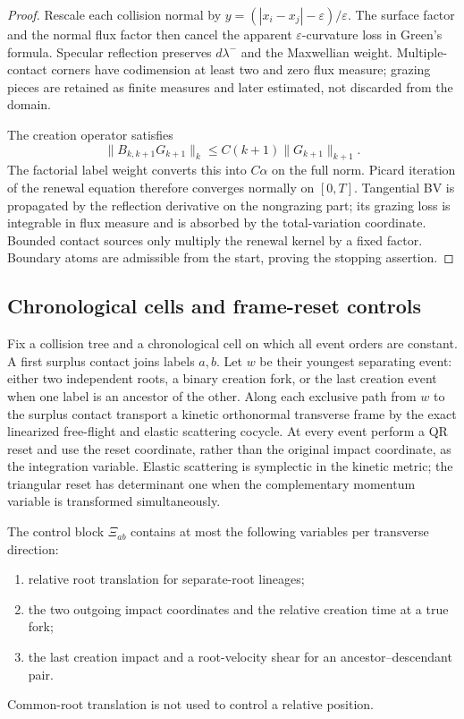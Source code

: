 \begin{proof}
Rescale each collision normal by
$y=(|x_i-x_j|-\varepsilon)/\varepsilon$.  The surface factor and the normal
flux factor then cancel the apparent $\varepsilon$-curvature loss in Green's
formula.  Specular reflection preserves $d\lambda^-$ and the Maxwellian
weight.  Multiple-contact corners have codimension at least two and zero flux
measure; grazing pieces are retained as finite measures and later estimated,
not discarded from the domain.

The creation operator satisfies
\[
 \|B_{k,k+1}G_{k+1}\|_{k}
 \le C(k+1)\|G_{k+1}\|_{k+1}.
\]
The factorial label weight converts this into $C\alpha$ on the full norm.
Picard iteration of the renewal equation therefore converges normally on
$[0,T]$.  Tangential BV is propagated by the reflection derivative on the
nongrazing part; its grazing loss is integrable in flux measure and is absorbed
by the total-variation coordinate.  Bounded contact sources only multiply the
renewal kernel by a fixed factor.  Boundary atoms are admissible from the
start, proving the stopping assertion.
\end{proof}

\subsection{Chronological cells and frame-reset controls}

Fix a collision tree and a chronological cell on which all event orders are
constant.  A first surplus contact joins labels $a,b$.  Let $w$ be their
youngest separating event: either two independent roots, a binary creation
fork, or the last creation event when one label is an ancestor of the other.
Along each exclusive path from $w$ to the surplus contact transport a kinetic
orthonormal transverse frame by the exact linearized free-flight and elastic
scattering cocycle.  At every event perform a QR reset and use the reset
coordinate, rather than the original impact coordinate, as the integration
variable.  Elastic scattering is symplectic in the kinetic metric; the
triangular reset has determinant one when the complementary momentum variable
is transformed simultaneously.

The control block $\Xi_{ab}$ contains at most the following variables per
transverse direction:
\begin{enumerate}[label=(\roman*)]
\item relative root translation for separate-root lineages;
\item the two outgoing impact coordinates and the relative creation time at a
true fork;
\item the last creation impact and a root-velocity shear for an
ancestor--descendant pair.
\end{enumerate}
Common-root translation is not used to control a relative position.

